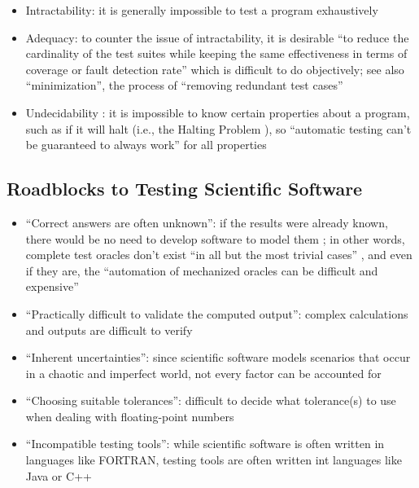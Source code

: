 \begin{itemize}
      \item Intractability: it is generally impossible to test a program
            exhaustively \exhInfCite{}
      \item Adequacy: to counter the issue of intractability, it is desirable
            ``to reduce the cardinality of the test suites while keeping the
            same effectiveness in terms of coverage or fault detection rate''
            \citep[p.~5-4]{SWEBOK2024} which is difficult to do objectively;
            see also ``minimization'', the process of ``removing redundant test
            cases'' \citep[p.~5-4]{SWEBOK2024}
      \item Undecidability \citep[p.~439]{PetersAndPedrycz2000}: it is
            impossible to know certain properties about a program, such as if
            it will halt (i.e., the Halting Problem
            \citep[p.~4]{gurfinkel_testing_2017}), so ``automatic testing
            can't be guaranteed to always work'' for all properties
            \citep{nelson_formal_1999} 
\end{itemize}

\subsection[Roadblocks to Testing Scientific Software]
{Roadblocks to Testing Scientific Software
      \citep[p.~67]{KanewalaAndYuehChen2019}}
\label{chap:testing:sec:sci-testing-roadblocks}
\begin{itemize}
      \item ``Correct answers are often unknown'': if the results were already
            known, there would be no need to develop software to model them
            \citep[p.~67]{KanewalaAndYuehChen2019}; in other words, complete
            test oracles don't exist ``in all but the most trivial cases''
            \citep[p.~510]{BarrEtAl2015}, and even if they are, the
            ``automation of mechanized oracles can be difficult and expensive''
            \citep[p.~5.5]{SWEBOK2024}
      \item ``Practically difficult to validate the computed output'': complex
            calculations and outputs are difficult to verify
            \citep[p.~67]{KanewalaAndYuehChen2019}
      \item ``Inherent uncertainties'': since scientific software models
            scenarios that occur in a chaotic and imperfect world, not every
            factor can be accounted for \citep[p.~67]{KanewalaAndYuehChen2019}
      \item ``Choosing suitable tolerances'': difficult to decide what
            tolerance(s) to use when dealing with floating-point numbers
            \citep[p.~67]{KanewalaAndYuehChen2019}
      \item ``Incompatible testing tools'': while scientific software is often
            written in languages like FORTRAN, testing tools are often written
            int languages like Java or C++ \citep[p.~67]{KanewalaAndYuehChen2019}
\end{itemize}

